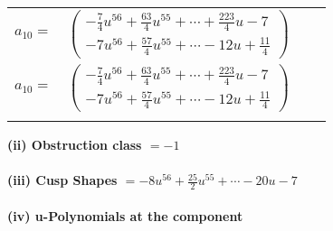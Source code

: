 \documentclass[1p]{elsarticle_modified}
\theoremstyle{definition}
\begin{document}
\begin{tabular}{m{7pt} m{180pt} m{7pt} m{180pt} }
\flushright $a_{10}=$&$\begin{pmatrix}-\frac{7}{4} u^{56}+\frac{63}{4} u^{55}+\cdots+\frac{223}{4} u-7\\-7 u^{56}+\frac{57}{4} u^{55}+\cdots-12 u+\frac{11}{4}\end{pmatrix}$\\ \flushright $a_{10}=$&$\begin{pmatrix}-\frac{7}{4} u^{56}+\frac{63}{4} u^{55}+\cdots+\frac{223}{4} u-7\\-7 u^{56}+\frac{57}{4} u^{55}+\cdots-12 u+\frac{11}{4}\end{pmatrix}$\\&\end{tabular}
\flushleft \textbf{(ii) Obstruction class $= -1$}\\~\\
\flushleft \textbf{(iii) Cusp Shapes $= -8 u^{56}+\frac{25}{2} u^{55}+\cdots-20 u-7$}\\~\\
\newpage\renewcommand{\arraystretch}{1}
\flushleft \textbf{(iv) u-Polynomials at the component}\newline \\
\end{document}
